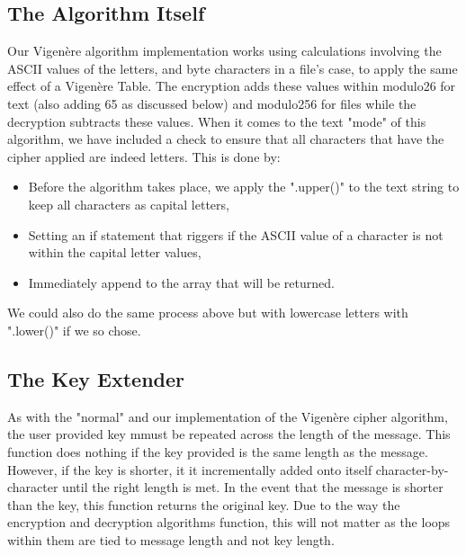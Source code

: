 \documentclass[a4paper, 12pt, titlepage]{report}
\begin{document}
\subsection{The Algorithm Itself}
Our Vigenère algorithm implementation works using calculations involving the ASCII values of the letters, and byte characters in a file's case, to apply the same effect of a Vigenère Table. The encryption adds these values within modulo26 for text (also adding 65 as discussed below) and modulo256 for files while the decryption subtracts these values. When it comes to the text "mode" of this algorithm, we have included a check to ensure that all characters that have the cipher applied are indeed letters. This is done by:
\begin{itemize}
\item Before the algorithm takes place, we apply the ".upper()" to the text string to keep all characters as capital letters,
\item Setting an if statement that riggers if the ASCII value of a character is not within the capital letter values,
\item Immediately append to the array that will be returned.
\end{itemize}
We could also do the same process above but with lowercase letters with ".lower()" if we so chose.
\subsection{The Key Extender}
As with the "normal" and our implementation of the Vigenère cipher algorithm, the user provided key mmust be repeated across the length of the message. This function does nothing if the key provided is the same length as the message. However, if the key is shorter, it it incrementally added onto itself character-by-character until the right length is met.
In the event that the message is shorter than the key, this function returns the original key. Due to the way the encryption and decryption algorithms function, this will not matter as the loops within them are tied to message length and not key length.
\end{document}
